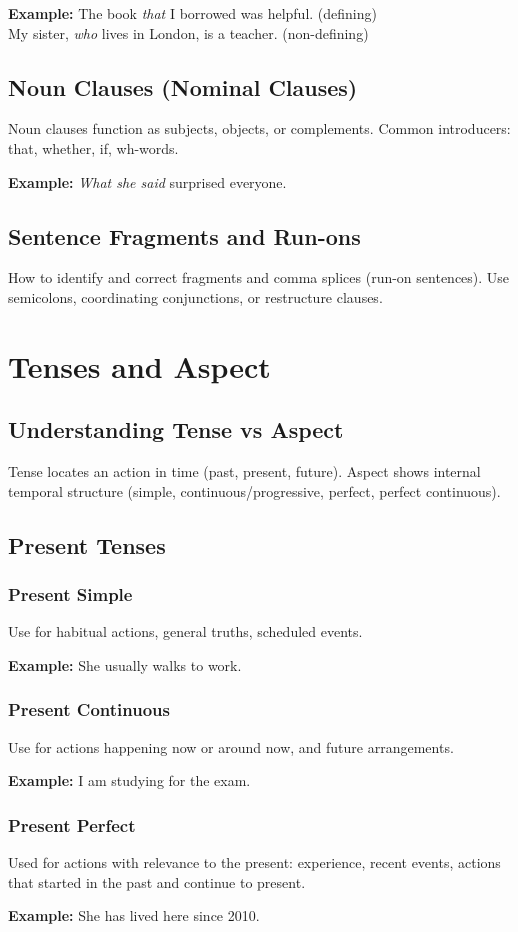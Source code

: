 \documentclass[12pt,oneside]{book}
\newcommand{\ex}[1]{\begin{examplebox}\textbf{Example:} #1\end{examplebox}}
\begin{document}
\ex{The book \textit{that} I borrowed was helpful. (defining) \\ My sister, \textit{who} lives in London, is a teacher. (non-defining)}

\section{Noun Clauses (Nominal Clauses)}
Noun clauses function as subjects, objects, or complements. Common introducers: that, whether, if, wh-words.

\ex{\textit{What she said} surprised everyone.}

\section{Sentence Fragments and Run-ons}
How to identify and correct fragments and comma splices (run-on sentences). Use semicolons, coordinating conjunctions, or restructure clauses.

\chapter{Tenses and Aspect}
\section{Understanding Tense vs Aspect}
Tense locates an action in time (past, present, future). Aspect shows internal temporal structure (simple, continuous/progressive, perfect, perfect continuous).

\section{Present Tenses}
\subsection{Present Simple}
Use for habitual actions, general truths, scheduled events.
\ex{She usually walks to work.}
\subsection{Present Continuous}
Use for actions happening now or around now, and future arrangements.
\ex{I am studying for the exam.}
\subsection{Present Perfect}
Used for actions with relevance to the present: experience, recent events, actions that started in the past and continue to present.
\ex{She has lived here since 2010.}
\end{document}
